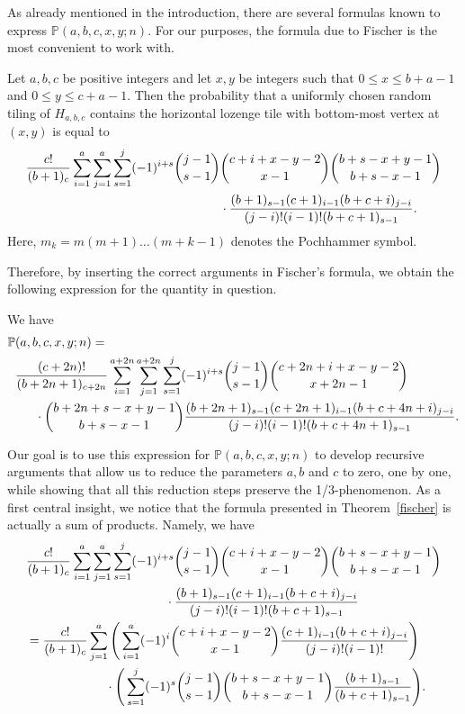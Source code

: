 \documentclass{amsart}
\numberwithin{equation}{section}
\begin{document}
As already mentioned in the introduction, there are several formulas known to express $\mathbb{P}(a,b,c,x,y;n)$. For our purposes, the formula due to Fischer is the most convenient to work with.
\begin{thm}\label{fischer}
    Let $a,b,c$ be positive integers and let $x,y$ be integers such that $0\leq x\leq b+a-1$ and $0\leq y\leq c+a-1$. Then the probability that a uniformly chosen random tiling of $H_{a,b,c}$ contains the horizontal lozenge tile with bottom-most vertex at $(x,y)$ is equal to
    \begin{align}
        \frac{c!}{(b+1)_c}\sum_{i=1}^{a}\sum_{j=1}^{a}\sum_{s=1}^{j}(-1)^{i+s}\binom{j-1}{s-1}&\binom{c+i+x-y-2}{x-1}\binom{b+s-x+y-1}{b+s-x-1}\notag\\
        &\cdot \frac{(b+1)_{s-1}(c+1)_{i-1}(b+c+i)_{j-i}}{(j-i)!(i-1)!(b+c+1)_{s-1}}.\notag
    \end{align}
    Here, $m_k=m(m+1)\dots(m+k-1)$ denotes the Pochhammer symbol.
\end{thm}

Therefore, by inserting the correct arguments in Fischer's formula, we obtain the following expression for the quantity in question.
\begin{cor} \label{corform}
    We have
    \begin{align}
        \mathbb{P}&(a,b,c,x,y;n)=\notag \\
        &\frac{(c+2n)!}{(b+2n+1)_{c+2n}}\sum_{i=1}^{a+2n}\sum_{j=1}^{a+2n}\sum_{s=1}^{j}(-1)^{i+s}\binom{j-1}{s-1}\binom{c+2n+i+x-y-2}{x+2n-1}\notag\\
        &\hphantom{aaa} \cdot\binom{b+2n+s-x+y-1}{b+s-x-1} \frac{(b+2n+1)_{s-1}(c+2n+1)_{i-1}(b+c+4n+i)_{j-i}}{(j-i)!(i-1)!(b+c+4n+1)_{s-1}}.\notag
    \end{align}
\end{cor}

Our goal is to use this expression for $\mathbb{P}(a,b,c,x,y;n)$ to develop recursive arguments that allow us to reduce the parameters $a,b$ and $c$ to zero, one by one, while showing that all this reduction steps preserve the 1/3-phenomenon. As a first central insight, we notice that the formula presented in Theorem~\ref{fischer} is actually a sum of products. Namely, we have
\begin{align}
     &\frac{c!}{(b+1)_c}\sum_{i=1}^{a}\sum_{j=1}^{a}\sum_{s=1}^{j}(-1)^{i+s}\binom{j-1}{s-1}\binom{c+i+x-y-2}{x-1}\binom{b+s-x+y-1}{b+s-x-1}\notag\\
        &\hphantom{aaaaaaaaaaaaaaaaaaaaa}\cdot \frac{(b+1)_{s-1}(c+1)_{i-1}(b+c+i)_{j-i}}{(j-i)!(i-1)!(b+c+1)_{s-1}}\notag\\
         &=\frac{c!}{(b+1)_c}\sum_{j=1}^{a}\Bigg(\sum_{i=1}^{a}(-1)^{i}\binom{c+i+x-y-2}{x-1}\frac{(c+1)_{i-1}(b+c+i)_{j-i}}{(j-i)!(i-1)!}   \Bigg)\notag\\
        &\hphantom{aaaaaaaaaaaa}\cdot \Bigg(\sum_{s=1}^{j} (-1)^s\binom{j-1}{s-1}\binom{b+s-x+y-1}{b+s-x-1}\frac{(b+1)_{s-1}}{(b+c+1)_{s-1}}     \Bigg).\notag
\end{align}
\end{document}
